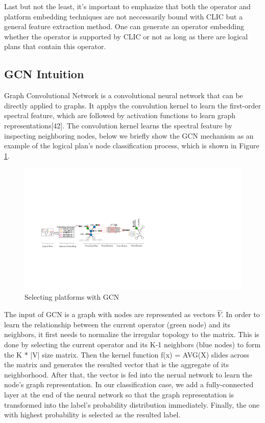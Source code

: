 Last but not the least, it's important to emphasize that both the operator and platform embedding techniques are not neccessarily bound with CLIC but a general feature extraction method. 
One can generate an operator embedding whether the operator is supported by CLIC or not as long as there are logical plans that contain this operator.


\subsection{GCN Intuition}

Graph Convolutional Network is a convolutional neural network that can be directly applied to graphs. 
It applys the convolution kernel to learn the first-order spectral feature, which are followed by activation functions to learn graph representations[42]. 
The convolution kernel learns the spectral feature by inspecting neighboring nodes, below we briefly show the GCN mechanism as an example of the logical plan's node classification process, which is shown in Figure \ref{fig:gcn}.

\begin{figure}
  \centering
  \includegraphics[width=\linewidth]{figures/GCN-new.pdf}
  \caption{Selecting platforms with GCN}
  \label{fig:gcn}
\end{figure}

The input of GCN is a graph with nodes are represented as vectors $\hat{V}$. 
In order to learn the relationship between the current operator (green node) and its neighbors, it first needs to normalize the irregular topology to the matrix. 
This is done by selecting the current operator and its K-1 neighbors (blue nodes) to form the K * |V| size matrix. 
Then the kernel function f(x) = AVG(X) slides across the matrix and generates the resulted vector that is the aggregate of its neighborhood. 
After that, the vector is fed into the nerual network to learn the node's graph representation. 
In our classification case, we add a fully-connected layer at the end of the neural network so that the graph representation is transformed into the label's probability distribution immediately. 
Finally, the one with highest probability is selected as the resulted label.


